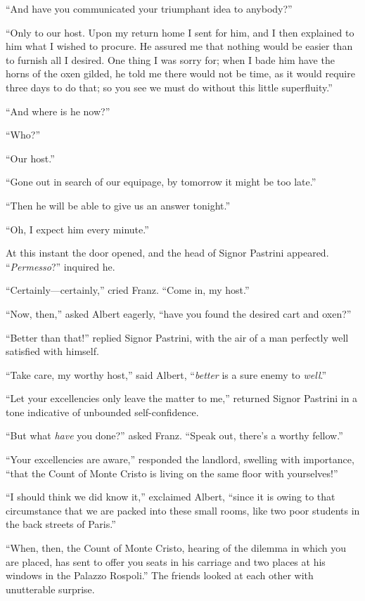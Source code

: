 “And have you communicated your triumphant idea to anybody?”

“Only to our host. Upon my return home I sent for him, and I then
explained to him what I wished to procure. He assured me that nothing
would be easier than to furnish all I desired. One thing I was sorry
for; when I bade him have the horns of the oxen gilded, he told me
there would not be time, as it would require three days to do that; so
you see we must do without this little superfluity.”

“And where is he now?”

“Who?”

“Our host.”

“Gone out in search of our equipage, by tomorrow it might be too late.”

“Then he will be able to give us an answer tonight.”

“Oh, I expect him every minute.”

At this instant the door opened, and the head of Signor Pastrini
appeared. “\textit{Permesso}?” inquired he.

“Certainly—certainly,” cried Franz. “Come in, my host.”

“Now, then,” asked Albert eagerly, “have you found the desired cart and
oxen?”

“Better than that!” replied Signor Pastrini, with the air of a man
perfectly well satisfied with himself.

“Take care, my worthy host,” said Albert, “\textit{better} is a sure enemy to
\textit{well}.”

“Let your excellencies only leave the matter to me,” returned Signor
Pastrini in a tone indicative of unbounded self-confidence.

“But what \textit{have} you done?” asked Franz. “Speak out, there’s a worthy
fellow.”

“Your excellencies are aware,” responded the landlord, swelling with
importance, “that the Count of Monte Cristo is living on the same floor
with yourselves!”

“I should think we did know it,” exclaimed Albert, “since it is owing
to that circumstance that we are packed into these small rooms, like
two poor students in the back streets of Paris.”

“When, then, the Count of Monte Cristo, hearing of the dilemma in which
you are placed, has sent to offer you seats in his carriage and two
places at his windows in the Palazzo Rospoli.” The friends looked at
each other with unutterable surprise.

